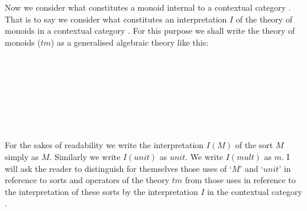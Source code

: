 
\note
Now we consider what constitutes a monoid internal to a contextual category \catc. That is to say 
we consider what constitutes an interpretation $I$ of the theory of monoids   in a contextual category \catc.
For this purpose we shall write the theory of monoids ($tm$) as a generalised algebraic theory like this: 
\begin{gatrules}
\gatintros
{}
 \\
 \\
 \\
\gataxioms

\begin{gatgroup}{}
 \\
\end{gatgroup} \\
\end{gatrules}
\note 
For the sakes of readability we write the interpretation $I(M)$ of the sort $M$ simply as $M$. Similarly we write $I(unit)$ as $unit$. We write $I(mult)$ as $m$. I will ask the reader  to distinguish for themselves 
those uses of `$M$' and `$unit$' in reference to sorts and operators of the theory $tm$ from those uses in reference to the interpretation of these sorts by the interpretation $I$ in the contextual category \catc. 

\newcommand{\wM}{\ofT{w}{M}}
\newcommand{\xM}{\ofT{x_1, x_2}{M}}
\newcommand{\yM}{\ofT{y_1, y_2, y_3}{M}}
\newcommand{\doubleM}{M^2}                       %
\newcommand{\trebleM}{M^3}                       %
\newcommand{\quadM}{M^4}                         %
\newcommand{\spi}{s(p_{M^3,M^i})}
\newcommand{\sptrebleone}{s(p_{M^3,M^1})}
\newcommand{\sptrebletwo}{s(p_{M^3,M^2})}
\newcommand{\sptreblethree}{s(p_{M^3,M^3})}
\newcommand{\fmult}{m}  %

